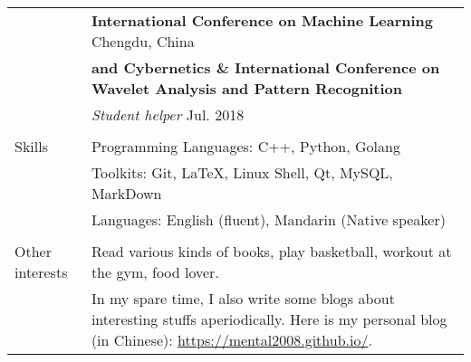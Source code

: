 \documentclass[letterpaper, 11pt]{article}
\begin{document}
\begin{longtable}{p{1.3in}p{4.8in}}
& \textbf{International Conference on Machine Learning} \hfill Chengdu, China \\
& \textbf{and Cybernetics \& International Conference on Wavelet Analysis and Pattern Recognition} \\
& \textit{Student helper} \hfill Jul. 2018 \\

& \\

{Skills}
& Programming Languages: C++, Python, Golang \\
& Toolkits: Git, \LaTeX, Linux Shell, Qt, MySQL, MarkDown \\
& Languages: English (fluent), Mandarin (Native speaker) \\
& \\


\nohyphens{Other interests}
& Read various kinds of books, play basketball, workout at the gym, food lover. \\
& In my spare time, I also write some blogs about interesting stuffs aperiodically. Here is my personal blog (in Chinese): \href{https://mental2008.github.io/}{https://mental2008.github.io/}. \\


\end{longtable}
\end{document}

